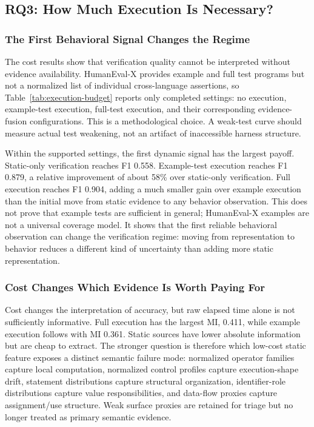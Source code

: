 ﻿\documentclass[conference]{IEEEtran}
\begin{document}
\subsection{RQ3: How Much Execution Is Necessary?}
\subsubsection{The First Behavioral Signal Changes the Regime}
The cost results show that verification quality cannot be interpreted without evidence availability. HumanEval-X provides example and full test programs but not a normalized list of individual cross-language assertions, so Table~\ref{tab:execution-budget} reports only completed settings: no execution, example-test execution, full-test execution, and their corresponding evidence-fusion configurations. This is a methodological choice. A weak-test curve should measure actual test weakening, not an artifact of inaccessible harness structure.

Within the supported settings, the first dynamic signal has the largest payoff. Static-only verification reaches F1 0.558. Example-test execution reaches F1 0.879, a relative improvement of about 58\% over static-only verification. Full execution reaches F1 0.904, adding a much smaller gain over example execution than the initial move from static evidence to any behavior observation. This does not prove that example tests are sufficient in general; HumanEval-X examples are not a universal coverage model. It shows that the first reliable behavioral observation can change the verification regime: moving from representation to behavior reduces a different kind of uncertainty than adding more static representation.


\subsubsection{Cost Changes Which Evidence Is Worth Paying For}
Cost changes the interpretation of accuracy, but raw elapsed time alone is not sufficiently informative. Full execution has the largest MI, 0.411, while example execution follows with MI 0.361. Static sources have lower absolute information but are cheap to extract. The stronger question is therefore which low-cost static feature exposes a distinct semantic failure mode: normalized operator families capture local computation, normalized control profiles capture execution-shape drift, statement distributions capture structural organization, identifier-role distributions capture value responsibilities, and data-flow proxies capture assignment/use structure. Weak surface proxies are retained for triage but no longer treated as primary semantic evidence.
\end{document}
